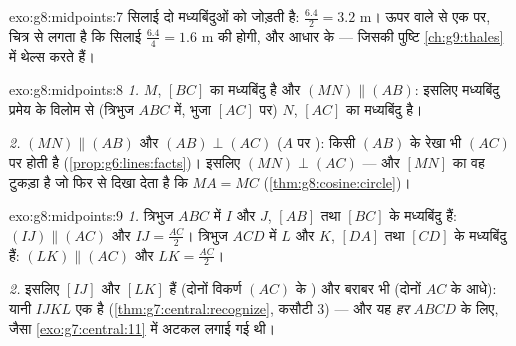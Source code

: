\begin{solution}{exo:g8:midpoints:7}
सिलाई दो मध्यबिंदुओं को जोड़ती है: $\frac{6.4}{2} = 3.2$ m। ऊपर
वाले  से एक  पर, चित्र से लगता है कि सिलाई
$\frac{6.4}{4} = 1.6$ m की होगी, और आधार के  --- जिसकी पुष्टि
\cref{ch:g9:thales} में थेल्स करते हैं।
\end{solution}

\begin{solution}{exo:g8:midpoints:8}
\emph{1.} $M$, $[BC]$ का मध्यबिंदु है और $(MN) \parallel (AB)$:
इसलिए मध्यबिंदु प्रमेय के विलोम से (त्रिभुज $ABC$ में, भुजा $[AC]$
पर) $N$, $[AC]$ का मध्यबिंदु है।

\emph{2.} $(MN) \parallel (AB)$ और $(AB) \perp (AC)$ ($A$ पर
): किसी $(AB)$ के  रेखा भी $(AC)$ पर  होती है
(\cref{prop:g6:lines:facts})। इसलिए $(MN) \perp (AC)$ --- और
 $[MN]$  का वह टुकड़ा है जो फिर से दिखा देता
है कि $MA = MC$ (\cref{thm:g8:cosine:circle})।
\end{solution}

\begin{solution}{exo:g8:midpoints:9}
\emph{1.} त्रिभुज $ABC$ में $I$ और $J$, $[AB]$ तथा $[BC]$ के
मध्यबिंदु हैं: $(IJ) \parallel (AC)$ और $IJ = \frac{AC}{2}$।
त्रिभुज $ACD$ में $L$ और $K$, $[DA]$ तथा $[CD]$ के मध्यबिंदु हैं:
$(LK) \parallel (AC)$ और $LK = \frac{AC}{2}$।

\emph{2.} इसलिए $[IJ]$ और $[LK]$  हैं (दोनों विकर्ण $(AC)$
के ) और बराबर भी (दोनों $AC$ के आधे): यानी $IJKL$ एक  है (\cref{thm:g7:central:recognize}, कसौटी 3) --- और यह
\emph{हर}  $ABCD$ के लिए, जैसा \cref{exo:g7:central:11} में
अटकल लगाई गई थी।
\end{solution}

